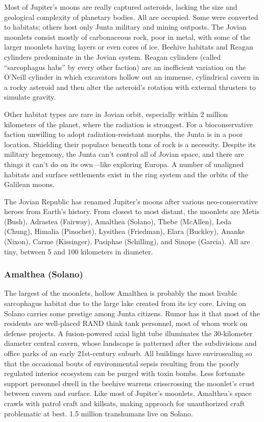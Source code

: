 Most of Jupiter's moons are really captured asteroids, lacking the size and geological complexity of 
planetary bodies. All are occupied. Some were converted to habitats; others host only Junta military and 
mining outposts. The Jovian moonlets consist mostly 
of carbonaceous rock, poor in metal, with some of 
the larger moonlets having layers or even cores of ice. 
Beehive habitats and Reagan cylinders predominate in 
the Jovian system. Reagan cylinders (called ``sarcophagus habs'' by every other faction) are an inefficient 
variation on the O'Neill cylinder in which excavators 
hollow out an immense, cylindrical cavern in a rocky 
asteroid and then alter the asteroid's rotation with 
external thrusters to simulate gravity.

Other habitat types are rare in Jovian orbit, especially within 2 million kilometers of the planet, where 
the radiation is strongest. For a bioconservative faction unwilling to adopt radiation-resistant morphs, the 
Junta is in a poor location. Shielding their populace 
beneath tons of rock is a necessity. Despite its military 
hegemony, the Junta can't control all of Jovian space, 
and there are things it can't do on its own—like exploring Europa. A number of unaligned habitats and 
surface settlements exist in the ring system and the 
orbits of the Galilean moons.

The Jovian Republic has renamed Jupiter's moons 
after various neo-conservative heroes from Earth's 
history. From closest to most distant, the moonlets are 
Metis (Bush), Adrastea (Fairway), Amalthea (Solano), 
Thebe (McAllen), Leda (Chung), Himalia (Pinochet), 
Lysithea (Friedman), Elara (Buckley), Ananke (Nixon), 
Carme (Kissinger), Pasiphae (Schilling), and Sinope 
(Garcia). All are tiny, between 5 and 100 kilometers 
in diameter.

\subsubsection{Amalthea (Solano)}

The largest of the moonlets, hollow Amalthea is probably the most livable sarcophagus habitat due to the 
large lake created from its icy core. Living on Solano 
carries some prestige among Junta citizens. Rumor has 
it that most of the residents are well-placed RAND 
think tank personnel, most of whom work on defense 
projects. A fusion-powered axial light tube illuminates the 30-kilometer diameter central cavern, whose 
landscape is patterned after the subdivisions and office 
parks of an early 21st-century suburb. All buildings 
have envirosealing so that the occasional bouts of environmental sepsis resulting from the poorly regulated 
interior ecosystem can be purged with toxin bombs. 
Less fortunate support personnel dwell in the beehive 
warrens crisscrossing the moonlet's crust between 
cavern and surface. Like most of Jupiter's moonlets, 
Amalthea's space crawls with patrol craft and killsats, 
making approach for unauthorized craft problematic 
at best. 1.5 million transhumans live on Solano.

